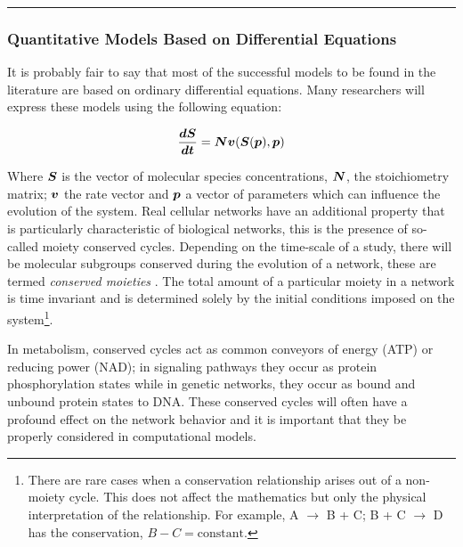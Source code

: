 \begin{center}\rule{3in}{0.4pt}\end{center}

\subsubsection{Quantitative Models Based on Differential Equations}

It is probably fair to say that most of the successful models to be
found in the literature are based on ordinary differential equations.
Many researchers will express these models using the following equation:

\begin{equation} \label{eq:system}
        \frac{\mbox{\boldmath $dS$}}{\mbox{\boldmath $dt$}} = \mbox{\boldmath $N$} \mbox{\boldmath $v$} (\mbox{\boldmath $S$} (\mbox{\boldmath $p$}), \mbox{\boldmath $p$})
\end{equation}

Where $\mbox{\boldmath $S$}$ is the vector of molecular species concentrations, $\mbox{\boldmath $N$}$,
the stoichiometry matrix; $\mbox{\boldmath $v$}$ the rate vector and $\mbox{\boldmath $p$}$ a vector of
parameters which can influence the evolution of the system. Real
cellular networks have an additional property that is particularly
characteristic of biological networks, this is the presence of so-called
moiety conserved cycles. Depending on the time-scale of a study, there
will be molecular subgroups conserved during the evolution of a network,
these are termed \emph{conserved moieties} \autocite{Re81}. The total
amount of a particular moiety in a network is time invariant and is
determined solely by the initial conditions imposed on the
system\footnote{There are rare cases when a conservation relationship
  arises out of a non-moiety cycle. This does not affect the mathematics
  but only the physical interpretation of the relationship. For example,
  A $\rightarrow$ B + C; B + C $\rightarrow$ D has the conservation,
  $B - C =\mbox{constant}$.}.

In metabolism, conserved cycles act as common conveyors of energy (ATP)
or reducing power (NAD); in signaling pathways they occur as protein
phosphorylation states while in genetic networks, they occur as bound
and unbound protein states to DNA. These conserved cycles will often
have a profound effect on the network behavior and it is important that
they be properly considered in computational models.

